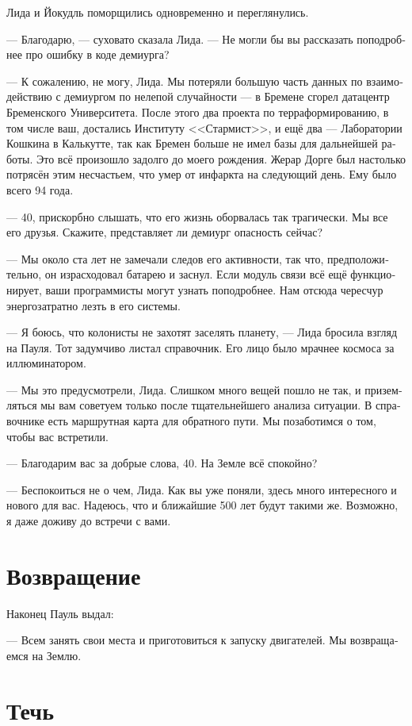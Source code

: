 \documentclass[a4paper,12pt,fleqn]{book}\usepackage{cooltooltips}\usepackage{polyglossia}\setdefaultlanguage[babelshorthands=true]{russian}\setotherlanguage{english}\defaultfontfeatures{Ligatures=TeX,Mapping=tex-text} \usepackage{xcolor}\definecolor{lightgray}{HTML}{bbbbbb}\color{lightgray}\newcommand{\ml}[3]{\textenglish{\textcolor{black}{#3}}}
\begin{document}
Лида и Йокудль поморщились одновременно и переглянулись.

--- Благодарю, --- суховато сказала Лида.
--- Не могли бы вы рассказать поподробнее про ошибку в коде демиурга?

--- К сожалению, не могу, Лида.
Мы потеряли большую часть данных по взаимодействию с демиургом по нелепой случайности --- в Бремене сгорел датацентр Бременского Университета.
После этого два проекта по терраформированию, в том числе ваш, достались Институту <<Стармист>>, и ещё два --- Лаборатории Кошкина в Калькутте, так как Бремен больше не имел базы для дальнейшей работы.
Это всё произошло задолго до моего рождения.
Жерар Дорге был настолько потрясён этим несчастьем, что умер от инфаркта на следующий день.
Ему было всего 94 года.

--- 40, прискорбно слышать, что его жизнь оборвалась так трагически.
Мы все его друзья.
Скажите, представляет ли демиург опасность сейчас?

--- Мы около ста лет не замечали следов его активности, так что, предположительно, он израсходовал батарею и заснул.
Если модуль связи всё ещё функционирует, ваши программисты могут узнать поподробнее.
Нам отсюда чересчур энергозатратно лезть в его системы.

--- Я боюсь, что колонисты не захотят заселять планету, --- Лида бросила взгляд на Пауля.
Тот задумчиво листал справочник.
Его лицо было мрачнее космоса за иллюминатором.

--- Мы это предусмотрели, Лида.
Слишком много вещей пошло не так, и приземляться мы вам советуем только после тщательнейшего анализа ситуации.
В справочнике есть маршрутная карта для обратного пути.
Мы позаботимся о том, чтобы вас встретили.

--- Благодарим вас за добрые слова, 40.
На Земле всё спокойно?

--- Беспокоиться не о чем, Лида.
Как вы уже поняли, здесь много интересного и нового для вас.
Надеюсь, что и ближайшие 500 лет будут такими же.
Возможно, я даже доживу до встречи с вами.

\section{Возвращение}

Наконец Пауль выдал:

--- Всем занять свои места и приготовиться к запуску двигателей.
Мы возвращаемся на Землю.

\section{Течь}
\end{document}
